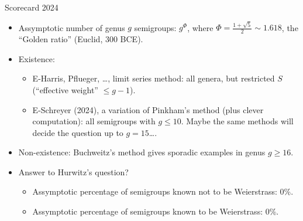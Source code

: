 \documentclass[12pt, aspectratio=169]{beamer}
\begin{document}
\begin{frame}{Scorecard 2024}\
\begin{itemize}
\item<1-> Assymptotic number of genus $g$ semigroups: $g^\Phi$, where $\Phi = \frac{1+\sqrt 5}{2}\sim 1.618$, the ``Golden ratio'' (Euclid, 300 BCE).
 \item<2-> Existence: 
\begin{itemize}
  \item<3-> E-Harris, Pflueger, \dots, limit series method: all genera, but restricted $S$ (``effective weight'' $\leq g-1$).
\item<3-> E-Schreyer (2024), a variation of Pinkham's method (plus clever computation): all semigroups with $g\leq 10$. Maybe the same methods will decide the question up to $g =15$\dots .
\end{itemize}
\item<4-> Non-existence: Buchweitz's method gives sporadic examples in genus $g \geq 16$.
\item<5-> Answer to Hurwitz's question?
\begin{itemize}
  \item<6-> \alert{Assymptotic percentage of semigroups  known not to be Weierstrass: 0\%.}
 \item<6-> \alert{Assymptotic percentage of semigroups  known to be Weierstrass: 0\%.}
\end{itemize}
 \end{itemize}
\end{frame}
\end{document}
